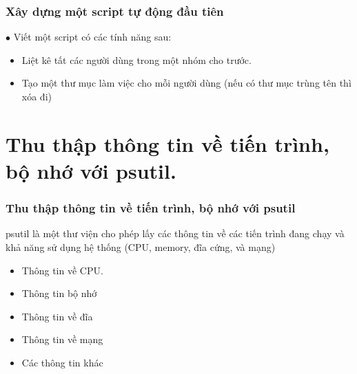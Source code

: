 \documentclass{beamer}
\begin{document}
\begin{frame}[label=scriptdautien]
\frametitle{Xây dựng một script tự động đầu tiên}
$\bullet$ Viết một script có các tính năng sau:
\begin{itemize}
\item Liệt kê tất các người dùng trong một nhóm cho trước.
\item Tạo một thư mục làm việc cho mỗi người dùng (nếu có thư mục trùng tên thì xóa đi)
\end{itemize}


\hyperlink{teptin}{}
\end{frame}

\section{Thu thập thông tin về tiến trình, bộ nhớ với psutil.} 
\begin{frame}[label=tientrinh]
\frametitle{Thu thập thông tin về tiến trình, bộ nhớ với psutil}

psutil là một thư viện cho phép lấy các thông tin về các tiến trình đang chạy và khả năng sử dụng hệ thống (CPU, memory, đĩa cứng, và mạng)
\begin{itemize}
\item Thông tin về CPU.
\item Thông tin bộ nhớ
\item Thông tin về đĩa 
\item Thông tin về mạng
\item Các thông tin khác
\end{itemize}
 
\hyperlink{intro}{}
\hyperlink{cuphap}{}
\end{frame}


\end{document}
